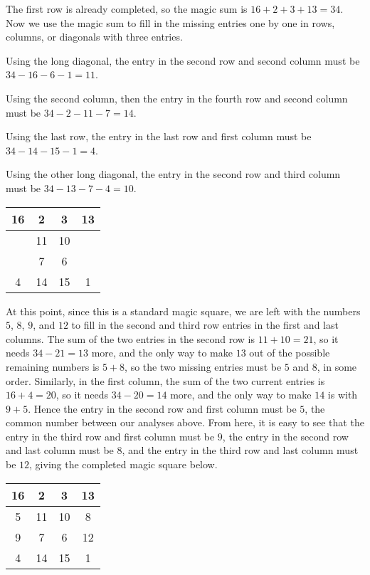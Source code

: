 \documentclass[11pt]{article}
\begin{document}
\begin{solution}
The first row is already completed, so the magic sum is $16 + 2 + 3 + 13 = 34$.
Now we use the magic sum to fill in the missing entries one by one in rows, columns, or diagonals with three entries.

Using the long diagonal, the entry in the second row and second column must be $34-16-6-1=11$.

Using the second column, then the entry in the fourth row and second column must be $34-2-11-7=14$.

Using the last row, the entry in the last row and first column must be $34-14-15-1=4$.

Using the other long diagonal, the entry in the second row and third column must be $34-13-7-4=10$.

\begin{center}
\begin{tabular}{|c|c|c|c|}
\hline
16 & 2 & 3 & 13 \\ \hline
\phantom{5} & 11 & 10 & \phantom{8} \\ \hline
\phantom{9} & 7 & 6 & \phantom{12} \\ \hline
4 & 14 & 15 & 1 \\ \hline
\end{tabular}
\end{center}

At this point, since this is a standard magic square, we are left with the numbers $5$, $8$, $9$, and $12$ 
to fill in the second and third row entries in the first and last columns. The sum of the two entries
in the second row is $11+10 = 21$, so it needs $34-21 = 13$ more, and the only way to make $13$ out of
the possible remaining numbers is $5+8$, so the two missing entries must be $5$ and $8$, in some order.
Similarly, in the first column, the sum of the two current entries is $16+4=20$, so it needs $34-20=14$
more, and the only way to make $14$ is with $9+5$. Hence the entry in the second row and first column
must be $5$, the common number between our analyses above. From here, it is easy to see that the entry in
the third row and first column must be $9$, the entry in the second row and last column must be $8$,
and the entry in the third row and last column must be $12$, giving the completed magic square below.

\begin{center}
\begin{tabular}{|c|c|c|c|}
\hline
16 & 2 & 3 & 13 \\ \hline
5 & 11 & 10 & 8 \\ \hline
9 & 7 & 6 & 12 \\ \hline
4 & 14 & 15 & 1 \\ \hline
\end{tabular}
\end{center}
\end{solution}
\end{document}
